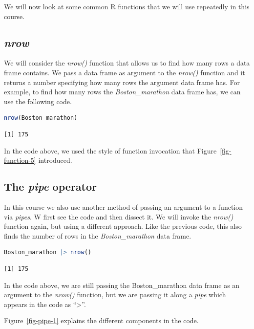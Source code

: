 \documentclass[
  12pt,
  letterpaper,
  DIV=11,
  numbers=noendperiod]{scrreprt}
\begin{document}
We will now look at some common R functions that we will use repeatedly
in this course.

\subsection{\texorpdfstring{\emph{nrow}}{nrow}}\label{nrow}

We will consider the \emph{nrow()} function that allows us to find how
many rows a data frame contains. We pass a data frame as argument to the
\emph{nrow()} function and it returns a number specifying how many rows
the argument data frame has. For example, to find how many rows the
\emph{Boston\_marathon} data frame has, we can use the following code.

\begin{lstlisting}[language=R]
nrow(Boston_marathon)
\end{lstlisting}

\begin{lstlisting}
[1] 175
\end{lstlisting}

In the code above, we used the style of function invocation that
Figure~\ref{fig-function-5} introduced.

\subsection{\texorpdfstring{The \emph{pipe}
operator}{The pipe operator}}\label{the-pipe-operator}

In this course we also use another method of passing an argument to a
function -- via \emph{pipes}. W first see the code and then dissect it.
We will invoke the \emph{nrow()} function again, but using a different
approach. Like the previous code, this also finds the number of rows in
the \emph{Boston\_marathon} data frame.

\begin{lstlisting}[language=R]
Boston_marathon |> nrow()
\end{lstlisting}

\begin{lstlisting}
[1] 175
\end{lstlisting}

In the code above, we are still passing the Boston\_marathon data frame
as an argument to the \emph{nrow()} function, but we are passing it
along a \emph{pipe} which appears in the code as
``\textbar\textgreater{}''.

Figure~\ref{fig-pipe-1} explains the different components in the code.
\end{document}
